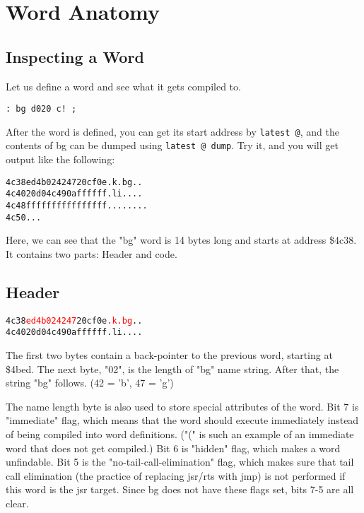 \chapter{Word Anatomy}

\section{Inspecting a Word}

Let us define a word and see what it gets compiled to.

\begin{verbatim}
: bg d020 c! ;
\end{verbatim}

After the word is defined, you can get its start address by \texttt{latest @}, and the contents of bg can be dumped using \texttt{latest @ dump}. Try it, and you will get output like the following:

\begin{alltt}
4c38  ed 4b 02 42 47 20 cf 0e .k.bg ..
4c40  20 d0 4c 49 0a ff ff ff  .li....
4c48  ff ff ff ff ff ff ff ff ........
4c50  ...
\end{alltt}

Here, we can see that the "bg" word is 14 bytes long and starts at address \$4c38. It contains two parts: Header and code.

\section{Header}

\begin{alltt}
4c38  \textcolor{red}{ed 4b 02 42 47} 20 cf 0e \textcolor{red}{.k.bg} ..
4c40  20 d0 4c 49 0a ff ff ff  .li....
\end{alltt}

The first two bytes contain a back-pointer to the previous word, starting at \$4bed. The next byte, "02", is the length of "bg" name string. After that, the string "bg" follows. (42 = 'b', 47 = 'g')

The name length byte is also used to store special attributes of the word. Bit 7 is "immediate" flag, which means that the word should execute immediately instead of being compiled into word definitions. ("(" is such an example of an immediate word that does not get compiled.) Bit 6 is "hidden" flag, which makes a word unfindable. Bit 5 is the "no-tail-call-elimination" flag, which makes sure that tail call elimination (the practice of replacing jsr/rts with jmp) is not performed if this word is the jsr target. Since bg does not have these flags set, bits 7-5 are all clear.

